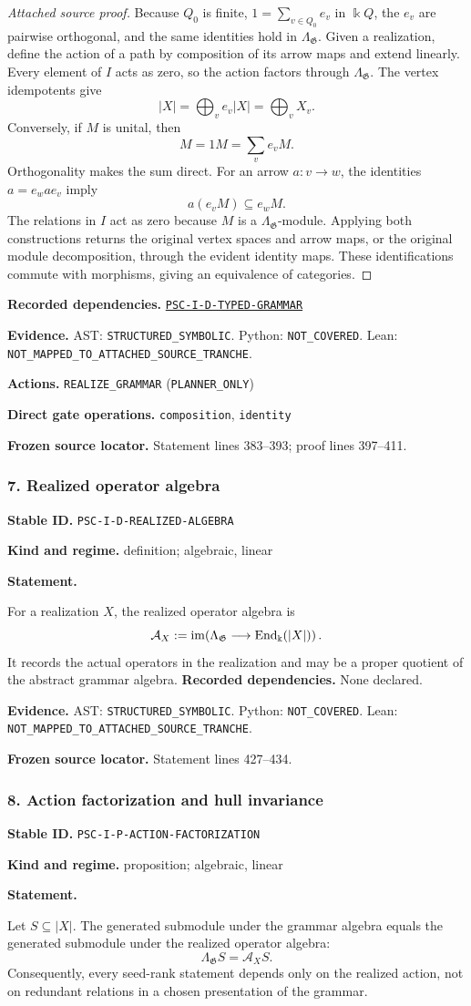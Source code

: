 \documentclass[a4paper,11pt]{article}
\newcommand{\bbk}{\Bbbk}\newcommand{\A}{\mathcal A}\newcommand{\B}{\mathcal B}\newcommand{\Ccal}{\mathcal C}\newcommand{\Pcal}{\mathcal P}\newcommand{\Qcal}{\mathcal Q}\newcommand{\Rcal}{\mathcal R}\newcommand{\Scal}{\mathcal S}
\newcommand{\field}[2]{\noindent\textbf{#1.} #2\par}
\begin{document}
\begin{proof}[Attached source proof]
Because $Q_0$ is finite, $1=\sum_{v\in Q_0}e_v$ in $\bbk Q$, the $e_v$ are pairwise orthogonal, and the same identities hold in $\Lambda_{\mathfrak G}$.  Given a realization, define the action of a path by composition of its arrow maps and extend linearly.  Every element of $I$ acts as zero, so the action factors through $\Lambda_{\mathfrak G}$.  The vertex idempotents give
\[
|X|=\bigoplus_v e_v|X|=\bigoplus_vX_v.
\]
Conversely, if $M$ is unital, then
\[
M=1M=\sum_ve_vM.
\]
Orthogonality makes the sum direct.  For an arrow $a:v\to w$, the identities $a=e_wae_v$ imply
\[
a(e_vM)\subseteq e_wM.
\]
The relations in $I$ act as zero because $M$ is a $\Lambda_{\mathfrak G}$-module.  Applying both constructions returns the original vertex spaces and arrow maps, or the original module decomposition, through the evident identity maps.  These identifications commute with morphisms, giving an equivalence of categories.
\end{proof}
\field{Recorded dependencies}{\hyperref[rec:PSC-I-D-TYPED-GRAMMAR]{\nolinkurl{PSC-I-D-TYPED-GRAMMAR}}}
\field{Evidence}{AST: \nolinkurl{STRUCTURED_SYMBOLIC}. Python: \nolinkurl{NOT_COVERED}. Lean: \nolinkurl{NOT_MAPPED_TO_ATTACHED_SOURCE_TRANCHE}.}
\field{Actions}{\nolinkurl{REALIZE_GRAMMAR} (\nolinkurl{PLANNER_ONLY})}
\field{Direct gate operations}{\nolinkurl{composition}, \nolinkurl{identity}}
\field{Frozen source locator}{Statement lines 383--393; proof lines 397--411.}
\subsubsection*{7. Realized operator algebra}
\label{rec:PSC-I-D-REALIZED-ALGEBRA}
\field{Stable ID}{\nolinkurl{PSC-I-D-REALIZED-ALGEBRA}}
\field{Kind and regime}{definition; algebraic, linear}
\textbf{Statement.}\par
For a realization $X$, the realized operator algebra is
\[
\A_X:=\im\!\left(\Lambda_{\mathfrak G}\longrightarrow\End_{\bbk}(|X|)\right).
\]
It records the actual operators in the realization and may be a proper quotient of the abstract grammar algebra.
\field{Recorded dependencies}{None declared.}
\field{Evidence}{AST: \nolinkurl{STRUCTURED_SYMBOLIC}. Python: \nolinkurl{NOT_COVERED}. Lean: \nolinkurl{NOT_MAPPED_TO_ATTACHED_SOURCE_TRANCHE}.}
\field{Frozen source locator}{Statement lines 427--434.}
\subsubsection*{8. Action factorization and hull invariance}
\label{rec:PSC-I-P-ACTION-FACTORIZATION}
\field{Stable ID}{\nolinkurl{PSC-I-P-ACTION-FACTORIZATION}}
\field{Kind and regime}{proposition; algebraic, linear}
\textbf{Statement.}\par
Let $S\subseteq |X|$.  The generated submodule under the grammar algebra equals the generated submodule under the realized operator algebra:
\[
\Lambda_{\mathfrak G}S=\A_XS.
\]
Consequently, every seed-rank statement depends only on the realized action, not on redundant relations in a chosen presentation of the grammar.
\end{document}

